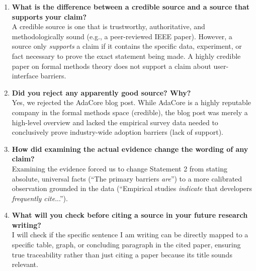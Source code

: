 \documentclass{article}
\begin{document}
\begin{enumerate}
    \item \textbf{What is the difference between a credible source and a source that supports your claim?} \\
    A credible source is one that is trustworthy, authoritative, and methodologically sound (e.g., a peer-reviewed IEEE paper). However, a source only \textit{supports} a claim if it contains the specific data, experiment, or fact necessary to prove the exact statement being made. A highly credible paper on formal methods theory does not support a claim about user-interface barriers.

    \item \textbf{Did you reject any apparently good source? Why?} \\
    Yes, we rejected the AdaCore blog post. While AdaCore is a highly reputable company in the formal methods space (credible), the blog post was merely a high-level overview and lacked the empirical survey data needed to conclusively prove industry-wide adoption barriers (lack of support).

    \item \textbf{How did examining the actual evidence change the wording of any claim?} \\
    Examining the evidence forced us to change Statement 2 from stating absolute, universal facts (``The primary barriers \textit{are}'') to a more calibrated observation grounded in the data (``Empirical studies \textit{indicate} that developers \textit{frequently cite}...'').

    \item \textbf{What will you check before citing a source in your future research writing?} \\
    I will check if the specific sentence I am writing can be directly mapped to a specific table, graph, or concluding paragraph in the cited paper, ensuring true traceability rather than just citing a paper because its title sounds relevant.
\end{enumerate}
\end{document}
